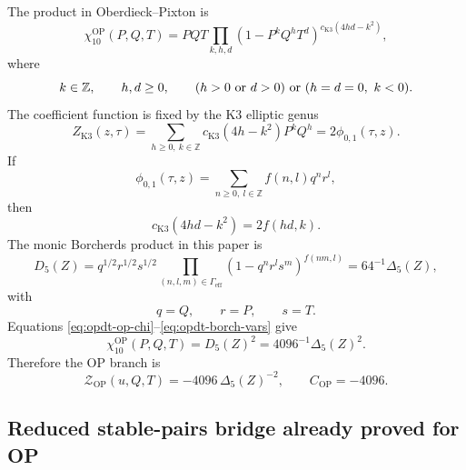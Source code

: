 The product in Oberdieck--Pixton \cite[(3)]{OB} is
\begin{equation}
\label{eq:opdt-op-chi}
\chi_{10}^{\mathrm{OP}}(P,Q,T)
=
PQT
\prod_{k,h,d}
\left(1-P^kQ^hT^d\right)^{c_{\mathrm{K3}}(4hd-k^2)},
\end{equation}
where
\begin{equation}
\label{eq:opdt-op-product-domain}
k\in\mathbb Z,\qquad h,d\geq0,\qquad
(h>0\ {\rm or}\ d>0)\ {\rm or}\ (h=d=0,\ k<0).
\end{equation}
The coefficient function is fixed by the K3 elliptic genus
\begin{equation}
\label{eq:opdt-k3-coefficients}
Z_{\mathrm{K3}}(z,\tau)
=
\sum_{h\geq0,\ k\in\mathbb Z}
c_{\mathrm{K3}}(4h-k^2)P^kQ^h
=2\phi_{0,1}(\tau,z).
\end{equation}
If
\begin{equation}
\label{eq:opdt-phi-coefficients}
\phi_{0,1}(\tau,z)=\sum_{n\geq0,\ l\in\mathbb Z}f(n,l)q^nr^l,
\end{equation}
then
\begin{equation}
\label{eq:opdt-coeff-doubling}
c_{\mathrm{K3}}(4hd-k^2)=2f(hd,k).
\end{equation}
The monic Borcherds product in this paper is
\begin{equation}
\label{eq:opdt-d5-product}
D_5(Z)
=
q^{1/2}r^{1/2}s^{1/2}
\prod_{(n,l,m)\in\Gamma_{\mathrm{eff}}}
\left(1-q^nr^ls^m\right)^{f(nm,l)}
=64^{-1}\Delta_5(Z),
\end{equation}
with
\begin{equation}
\label{eq:opdt-borch-vars}
q=Q,\qquad r=P,\qquad s=T.
\end{equation}
Equations \eqref{eq:opdt-op-chi}--\eqref{eq:opdt-borch-vars} give
\begin{equation}
\label{eq:opdt-chi-delta}
\chi_{10}^{\mathrm{OP}}(P,Q,T)
=D_5(Z)^2
=4096^{-1}\Delta_5(Z)^2.
\end{equation}
Therefore the OP branch is
\begin{equation}
\label{eq:opdt-op-constant}
\mathcal Z_{\mathrm{OP}}(u,Q,T)
=-4096\,\Delta_5(Z)^{-2},
\qquad
C_{\mathrm{OP}}=-4096.
\end{equation}

\subsection{Reduced stable-pairs bridge already proved for OP}

